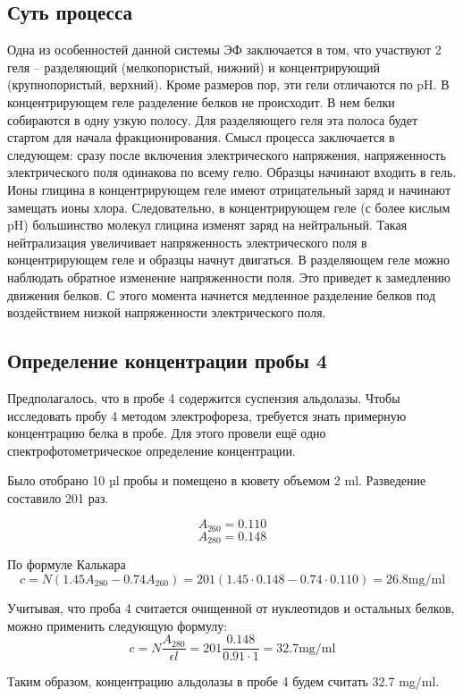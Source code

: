 \subsection{Суть процесса}

Одна из особенностей данной системы ЭФ заключается в том, что участвуют 2 геля --
разделяющий (мелкопористый, нижний) и концентрирующий (крупнопористый, верхний). Кроме размеров
пор, эти гели отличаются по pH. В концентрирующем геле разделение белков не происходит. В нем белки
собираются в одну узкую полосу. Для разделяющего геля эта полоса будет стартом для начала
фракционирования. Смысл процесса заключается в следующем: сразу после включения электрического
напряжения, напряженность электрического поля одинакова по всему гелю. Образцы начинают входить
в гель. Ионы глицина в концентрирующем геле имеют отрицательный заряд и начинают замещать ионы
хлора. Следовательно, в концентрирующем геле (с более кислым pH) большинство молекул глицина
изменят заряд на нейтральный. Такая нейтрализация увеличивает напряженность электрического
поля в концентрирующем геле и образцы начнут двигаться. В разделяющем геле можно наблюдать обратное
изменение напряженности поля. Это приведет к замедлению движения белков.
С этого момента начнется медленное разделение белков под воздействием низкой напряженности
электрического поля.

\subsection{Определение концентрации пробы 4}
Предполагалось, что в пробе 4 содержится суспензия альдолазы.
Чтобы исследовать пробу 4 методом электрофореза,
требуется знать примерную концентрацию белка в пробе.
Для этого провели ещё одно спектрофотометрическое определение концентрации.

Было отобрано 10 µl пробы и помещено в кювету объемом 2 ml.
Разведение составило 201 раз.

$$ A_{260} = 0.110 $$
$$ A_{280} = 0.148 $$

По формуле Калькара
$$ c = N (1.45 A_{280} - 0.74 A_{260}) = 201 (1.45 \cdot 0.148 - 0.74 \cdot 0.110) = 26.8 \text{mg/ml}$$

Учитывая, что проба 4 считается очищенной от нуклеотидов и остальных белков,
можно применить следующую формулу:
$$ c = N \frac{A_{280}}{\epsilon l} = 201 \frac{0.148}{0.91 \cdot 1} = 32.7 \text{mg/ml}$$

Таким образом, концентрацию альдолазы в пробе 4 будем считать 32.7 mg/ml.

